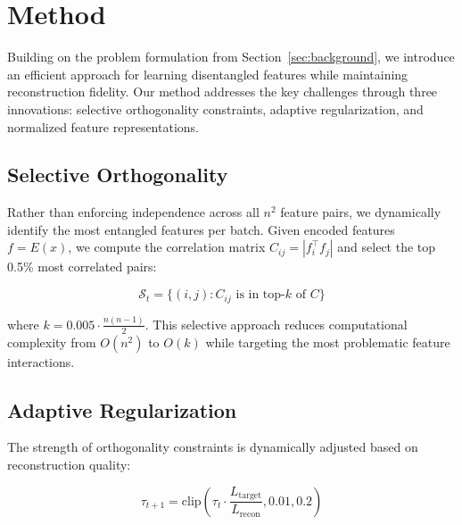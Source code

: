 \documentclass{article} %
\begin{document}



\section{Method}
\label{sec:method}

Building on the problem formulation from Section~\ref{sec:background}, we introduce an efficient approach for learning disentangled features while maintaining reconstruction fidelity. Our method addresses the key challenges through three innovations: selective orthogonality constraints, adaptive regularization, and normalized feature representations.

\subsection{Selective Orthogonality}
Rather than enforcing independence across all $n^2$ feature pairs, we dynamically identify the most entangled features per batch. Given encoded features $f = E(x)$, we compute the correlation matrix $C_{ij} = |f_i^\top f_j|$ and select the top 0.5\% most correlated pairs:

\begin{equation}
    \mathcal{S}_t = \{(i,j) : C_{ij} \text{ is in top-}k \text{ of } C\}
\end{equation}

where $k = 0.005 \cdot \frac{n(n-1)}{2}$. This selective approach reduces computational complexity from $O(n^2)$ to $O(k)$ while targeting the most problematic feature interactions.

\subsection{Adaptive Regularization}
The strength of orthogonality constraints is dynamically adjusted based on reconstruction quality:

\begin{equation}
    \tau_{t+1} = \text{clip}(\tau_t \cdot \frac{L_{\text{target}}}{L_{\text{recon}}}, 0.01, 0.2)
\end{equation}
\end{document}
